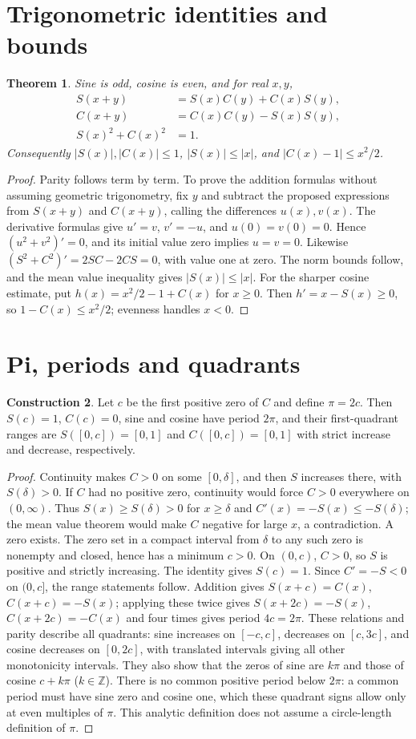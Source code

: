 \documentclass[11pt,oneside,a4paper]{book}
\newtheorem{theorem}{Theorem}[chapter]
\theoremstyle{definition}
\newtheorem{construction}[theorem]{Construction}
\theoremstyle{remark}
\newcommand{\Z}{\mathbb Z}
\newcommand{\KEntry}[2]{\Needspace{7\baselineskip}\section{#2}\label{#1}{\small\sffamily\color{black!60}\detokenize{#1}}\par}
\begin{document}
\KEntry{K03.07.trig_properties}{Trigonometric identities and bounds}
\begin{theorem}
Sine is odd, cosine is even, and for real $x,y$,
\begin{align*}
S(x+y)&=S(x)C(y)+C(x)S(y),\\
C(x+y)&=C(x)C(y)-S(x)S(y),\\
S(x)^2+C(x)^2&=1.
\end{align*}
Consequently $|S(x)|,|C(x)|\le1$, $|S(x)|\le|x|$, and
$|C(x)-1|\le x^2/2$.
\end{theorem}
\begin{proof}
Parity follows term by term. To prove the addition formulas without assuming
geometric trigonometry, fix $y$ and subtract the proposed expressions from
$S(x+y)$ and $C(x+y)$, calling the differences $u(x),v(x)$.
The derivative formulas give $u'=v$, $v'=-u$, and $u(0)=v(0)=0$.
Hence $(u^2+v^2)'=0$, and its initial value zero implies $u=v=0$.
Likewise $(S^2+C^2)'=2SC-2CS=0$, with value one at zero.
The norm bounds follow, and the mean value inequality gives $|S(x)|\le|x|$.
For the sharper cosine estimate, put $h(x)=x^2/2-1+C(x)$ for $x\ge0$.
Then $h'=x-S(x)\ge0$, so $1-C(x)\le x^2/2$; evenness handles $x<0$.
\end{proof}

\KEntry{K03.07.pi_period}{Pi, periods and quadrants}
\begin{construction}
Let $c$ be the first positive zero of $C$ and define $\pi=2c$.
Then $S(c)=1$, $C(c)=0$, sine and cosine have period $2\pi$,
and their first-quadrant ranges are $S([0,c])=[0,1]$ and
$C([0,c])=[0,1]$ with strict increase and decrease, respectively.
\end{construction}
\begin{proof}
Continuity makes $C>0$ on some $[0,\delta]$, and then $S$ increases there,
with $S(\delta)>0$. If $C$ had no positive zero, continuity would force
$C>0$ everywhere on $(0,\infty)$. Thus $S(x)\ge S(\delta)>0$ for
$x\ge\delta$ and $C'(x)=-S(x)\le-S(\delta)$; the mean value theorem
would make $C$ negative for large $x$, a contradiction. A zero exists.
The zero set in a compact interval from $\delta$ to any such zero is
nonempty and closed, hence has a minimum $c>0$. On $(0,c)$, $C>0$,
so $S$ is positive and strictly increasing. The identity gives $S(c)=1$.
Since $C'=-S<0$ on $(0,c]$, the range statements follow.
Addition gives $S(x+c)=C(x)$, $C(x+c)=-S(x)$; applying these twice gives
$S(x+2c)=-S(x)$, $C(x+2c)=-C(x)$ and four times gives period $4c=2\pi$.
These relations and parity describe all quadrants: sine increases on
$[-c,c]$, decreases on $[c,3c]$, and cosine decreases on $[0,2c]$,
with translated intervals giving all other monotonicity intervals.
They also show that the zeros of sine are $k\pi$ and those of cosine
$c+k\pi$ ($k\in\Z$). There is no common positive period below $2\pi$:
a common period must have sine zero and cosine one, which these quadrant
signs allow only at even multiples of $\pi$.
This analytic definition does not assume a circle-length definition of $\pi$.
\end{proof}
\end{document}
